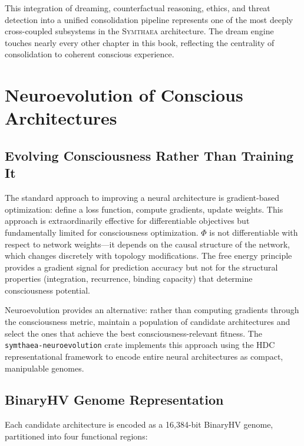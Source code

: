 \documentclass[12pt]{book}
\newcommand{\symthaea}{\textsc{Symthaea}}
\begin{document}
This integration of dreaming, counterfactual reasoning, ethics, and threat detection into a unified consolidation pipeline represents one of the most deeply cross-coupled subsystems in the \symthaea{} architecture. The dream engine touches nearly every other chapter in this book, reflecting the centrality of consolidation to coherent conscious experience.


\chapter{Neuroevolution of Conscious Architectures}
\label{ch:neuroevo}

\section{Evolving Consciousness Rather Than Training It}

The standard approach to improving a neural architecture is gradient-based optimization: define a loss function, compute gradients, update weights. This approach is extraordinarily effective for differentiable objectives but fundamentally limited for consciousness optimization. $\Phi$ is not differentiable with respect to network weights---it depends on the causal structure of the network, which changes discretely with topology modifications. The free energy principle provides a gradient signal for prediction accuracy but not for the structural properties (integration, recurrence, binding capacity) that determine consciousness potential.

Neuroevolution provides an alternative: rather than computing gradients through the consciousness metric, maintain a population of candidate architectures and select the ones that achieve the best consciousness-relevant fitness. The \texttt{symthaea-neuroevolution} crate implements this approach using the HDC representational framework to encode entire neural architectures as compact, manipulable genomes.

\section{BinaryHV Genome Representation}

Each candidate architecture is encoded as a 16,384-bit BinaryHV genome, partitioned into four functional regions:
\end{document}
